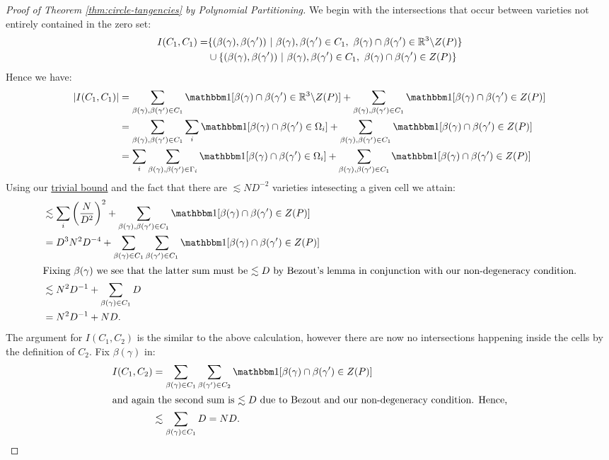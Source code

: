 \begin{proof}[Proof of Theorem \ref{thm:circle-tangencies} by Polynomial Partitioning]
We begin with the intersections that occur between varieties not entirely contained in the zero set:
\begin{align*}
    I(C_1,C_1) = &\{ (\beta(\gamma), \beta(\gamma')) \ |  \ \beta(\gamma), \beta(\gamma') \in C_1, \ \beta(\gamma) \cap \beta(\gamma') \in \RR^3 \backslash Z(P)\} \\
                & \cup \{ (\beta(\gamma), \beta(\gamma')) \ |  \ \beta(\gamma), \beta(\gamma') \in C_1, \ \beta(\gamma) \cap \beta(\gamma') \in Z(P)\}
\end{align*}
Hence we have:
\begin{align*}
    |I(C_1,C_1)| &= \sum_{\beta(\gamma), \beta(\gamma') \in C_1} \OO[\beta(\gamma) \cap \beta(\gamma') \in \RR^3 \backslash Z(P)] + 
                  \sum_{\beta(\gamma), \beta(\gamma') \in C_1} \OO[\beta(\gamma) \cap \beta(\gamma') \in Z(P)] \\
                 &= \sum_{\beta(\gamma), \beta(\gamma') \in C_1} \sum_i \OO[\beta(\gamma) \cap \beta(\gamma') \in \Omega_i] +
                 \sum_{\beta(\gamma), \beta(\gamma') \in C_1} \OO[\beta(\gamma) \cap \beta(\gamma') \in Z(P)]\\
                 &= \sum_i \sum_{\beta(\gamma), \beta(\gamma') \in \Gamma_i}  \OO[\beta(\gamma) \cap \beta(\gamma') \in \Omega_i] +
                  \sum_{\beta(\gamma), \beta(\gamma') \in C_1} \OO[\beta(\gamma) \cap \beta(\gamma') \in Z(P)]
\end{align*}
Using our \hyperref[thm:trivial-circle-bound]{trivial bound} and the fact that there are $\lesssim ND^{-2}$ varieties intesecting a given cell we attain:
\begin{align*}
                 &\lesssim \sum_i \left(\frac{N}{D^2}\right)^2 + \sum_{\beta(\gamma), \beta(\gamma') \in C_1} \OO[\beta(\gamma) \cap \beta(\gamma') \in Z(P)] \\
                 &= D^3 N^2 D^{-4} + \sum_{\beta(\gamma)\in C_1} \sum_{\beta(\gamma') \in C_1} \OO[\beta(\gamma) \cap \beta(\gamma') \in Z(P)]\\
                 \intertext{Fixing $\beta(\gamma)$ we see that the latter sum must be $\lesssim D$ by Bezout's lemma in conjunction with our non-degeneracy condition.}
                 &\lesssim  N^2 D^{-1} + \sum_{\beta(\gamma)\in C_1} D \\
                 &= N^2D^{-1} + ND.
\end{align*}
The argument for $I(C_1,C_2)$ is the similar to the above calculation, however there are now no intersections happening inside the cells by the definition of $C_2$.
 Fix $\beta(\gamma)$ in:
\begin{align*}
    I(C_1,C_2) &= \sum_{\beta(\gamma)\in C_1} \sum_{\beta(\gamma') \in C_2} \OO[\beta(\gamma) \cap \beta(\gamma') \in Z(P)] \\
    \intertext{and again the second sum is $\lesssim D$ due to Bezout and our non-degeneracy condition. Hence,}
    & \lesssim \sum_{\beta(\gamma)\in C_1} D = ND.
\end{align*}





    
\end{proof}